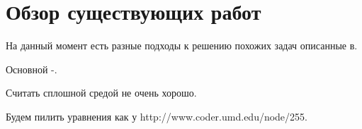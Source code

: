 \chapter{Обзор существующих работ}\label{ch:overview}
На данный момент есть разные подходы к решению похожих задач описанные
в\cite{kobylkin2014,rakhmatulin,kharchenko,walker1999,walker2001,porval}.

Основной -\cite{kobylkin2014}.

Считать сплошной средой не очень хорошо.

Будем пилить уравнения как у http://www.coder.umd.edu/node/255.